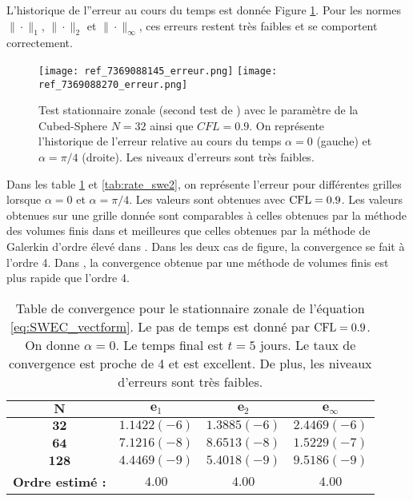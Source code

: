 L'historique de l''erreur au cours du temps est donnée Figure \ref{fig: williamson 2 erreur}. Pour les normes $\| \cdot \|_1$, $\| \cdot \|_2$ et $\| \cdot \|_{\infty}$, ces erreurs restent très faibles et se comportent correctement.

\begin{figure}[htbp]
\begin{center}
\texttt{[image: ref\_7369088145\_erreur.png]}
\texttt{[image: ref\_7369088270\_erreur.png]}
\end{center}
\caption{Test stationnaire zonale (second test de \cite{Williamson1992}) avec le paramètre de la Cubed-Sphere $N=32$ ainsi que $CFL=0.9$. On représente l'historique de l'erreur relative au cours du temps $\alpha = 0$ (gauche) et $\alpha = \pi/4$ (droite). Les niveaux d'erreurs sont très faibles.}
\label{fig: williamson 2 erreur}
\end{figure}

Dans les table \ref{tab:rate_swe1} et \ref{tab:rate_swe2}, on représente l'erreur pour différentes grilles lorsque $\alpha = 0$ et $\alpha = \pi/4$. Les valeurs sont obtenues avec $\text{CFL} = 0.9$. Les valeurs obtenues sur une grille donnée sont comparables à celles obtenues par la méthode des volumes finis dans \cite{Chen2008} et meilleures que celles obtenues par la méthode de Galerkin d'ordre élevé dans \cite{Kuang2016}. Dans les deux cas de figure, la convergence se fait à l'ordre 4. Dans \cite{Ullrich2011}, la convergence obtenue par une méthode de volumes finis est plus rapide que l'ordre 4. 

\begin{table}[htbp]
\begin{center}
\begin{tabular}{|c||c|c|c|}
\hline 
$\mathbf{N}$ & $\mathbf{e}_1$ & $\mathbf{e}_2$ & $\mathbf{e}_{\infty}$\\ 
\hline 
\hline 
$\mathbf{32}$ & $1.1422(-6)$ & $1.3885(-6)$ & $2.4469(-6)$\\ 

$\mathbf{64}$ & $7.1216(-8)$ & $8.6513(-8)$ & $1.5229(-7)$\\ 

$\mathbf{128}$ & $4.4469(-9)$ & $5.4018(-9)$ & $9.5186(-9)$\\

\hline
\textbf{Ordre estimé :} & $4.00$ & $4.00$ & $4.00$\\ 
\hline
\end{tabular} 
\end{center}
\caption{Table de convergence pour le stationnaire zonale de l'équation \eqref{eq:SWEC_vectform}. Le pas de temps est donné par $\text{CFL}=0.9$. On donne $\alpha = 0$. Le temps final est $t=5$ jours. Le taux de convergence est proche de 4 et est excellent. De plus, les niveaux d'erreurs sont très faibles.}
\label{tab:rate_swe1}
\end{table}

